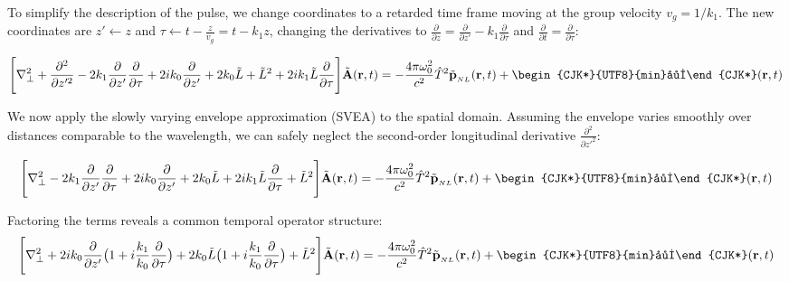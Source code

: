 \documentclass[11pt,a4paper]{article}
\newcommand{\gawa}{\text{\begin{CJK*}{UTF8}{min}川\end{CJK*}}}
\begin{document}
To simplify the description of the pulse, we change coordinates to a retarded time frame moving at the group velocity $v_g = 1/k_1$. The new coordinates are $z'\longleftarrow z$ and $\tau \longleftarrow t-\frac{z}{v_g}=t-k_1z$, changing the derivatives to $\frac{\partial}{\partial z} = \frac{\partial}{\partial z'}-k_1\frac{\partial}{\partial \tau}$ and $\frac{\partial}{\partial t}=\frac{\partial}{\partial \tau}$:

\begin{equation*}
\begin{split}
\Bigg[\nabla_\perp^2 + \frac{\partial^2}{\partial z'^2} -2k_1\frac{\partial}{\partial z'}\frac{\partial}{\partial \tau} + 2ik_0 \frac{\partial}{\partial z'} + 2k_0\tilde{L} + \tilde{L}^2 +2ik_1\tilde{L}\frac{\partial}{\partial \tau}\Bigg] \tilde{\mathbf{A}}(\mathbf{r},t)= -\frac{4\pi\omega_0^2}{c^2}\hat{T}^2\tilde{\mathbf{p}}_{_{NL}}(\mathbf{r},t)+\gawa (\mathbf{r},t)
\end{split}
\end{equation*}

We now apply the slowly varying envelope approximation (SVEA) to the spatial domain. Assuming the envelope varies smoothly over distances comparable to the wavelength, we can safely neglect the second-order longitudinal derivative $\frac{\partial^2}{\partial z'^2}$:

\begin{equation*}
\begin{split}
\Bigg[\nabla_\perp^2 -2k_1\frac{\partial}{\partial z'}\frac{\partial}{\partial \tau} + 2ik_0 \frac{\partial}{\partial z'} + 2k_0\tilde{L} + 2ik_1\tilde{L}\frac{\partial}{\partial \tau} +\tilde{L}^2\Bigg] \tilde{\mathbf{A}}(\mathbf{r},t)= -\frac{4\pi\omega_0^2}{c^2}\hat{T}^2\tilde{\mathbf{p}}_{_{NL}}(\mathbf{r},t)+\gawa (\mathbf{r},t)
\end{split}
\end{equation*}

Factoring the terms reveals a common temporal operator structure:
\begin{equation*}
\begin{split}
\Bigg[\nabla_\perp^2 + 2ik_0 \frac{\partial}{\partial z'}\big(1+i\frac{k_1}{k_0}\frac{\partial}{\partial \tau}\big)
+ 2k_0\tilde{L}\big(1+i\frac{k_1}{k_0}\frac{\partial}{\partial \tau}\big) +\tilde{L}^2\Bigg] \tilde{\mathbf{A}}(\mathbf{r},t) = -\frac{4\pi\omega_0^2}{c^2}\hat{T}^2\tilde{\mathbf{p}}_{_{NL}}(\mathbf{r},t)+\gawa (\mathbf{r},t)
\end{split}
\end{equation*}
\end{document}
